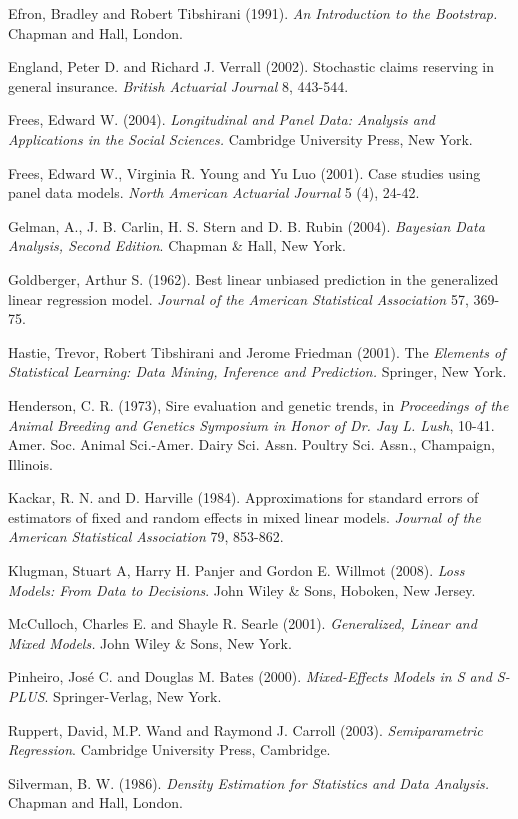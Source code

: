 \begin{multicols}{2}

Efron, Bradley and Robert Tibshirani (1991). \textit{An Introduction
to the Bootstrap.} Chapman and Hall, London.

England, Peter D. and Richard J. Verrall (2002). Stochastic claims
reserving in general insurance. \emph{British Actuarial Journal} 8,
443-544.

Frees, Edward W. (2004). \textit{Longitudinal and Panel Data:
Analysis and Applications in the Social Sciences.} Cambridge
University Press, New York.

Frees, Edward W., Virginia R. Young and Yu Luo (2001). Case studies
using panel data models. \emph{North American Actuarial Journal} 5
(4), 24-42.

Gelman, A., J. B. Carlin, H. S. Stern and D. B. Rubin (2004).
\textit{Bayesian Data Analysis, Second Edition}. Chapman \& Hall,
New York.

Goldberger, Arthur S. (1962).  Best linear unbiased prediction in
the generalized linear regression model. \textit{Journal of the
American Statistical Association} 57, 369-75.

Hastie, Trevor, Robert Tibshirani and Jerome Friedman (2001). The
\emph{Elements of Statistical Learning: Data Mining, Inference and
Prediction.} Springer, New York.

Henderson, C. R. (1973), Sire evaluation and genetic trends, in
\textit{Proceedings of the Animal Breeding and Genetics Symposium in
Honor of Dr. Jay L. Lush}, 10-41. Amer. Soc. Animal Sci.-Amer. Dairy
Sci. Assn. Poultry Sci. Assn., Champaign, Illinois.

Kackar, R. N. and D. Harville (1984). Approximations for standard
errors of estimators of fixed and random effects in mixed linear
models. \textit{Journal of the American Statistical Association} 79,
853-862.

Klugman, Stuart A, Harry H. Panjer and Gordon E. Willmot (2008).
\emph{Loss Models: From Data to Decisions}. John Wiley \& Sons,
Hoboken, New Jersey.

McCulloch, Charles E. and Shayle R. Searle (2001).
\textit{Generalized, Linear and Mixed Models.} John Wiley \& Sons,
New York.

Pinheiro, Jos\'{e} C. and Douglas M. Bates (2000).
\textit{Mixed-Effects Models in S and S-PLUS}. Springer-Verlag, New
York.

Ruppert, David, M.P. Wand and Raymond J. Carroll (2003).
\textit{Semiparametric Regression}. Cambridge University Press,
Cambridge.

Silverman, B. W. (1986). \textit{Density Estimation for Statistics
and Data Analysis.} Chapman and Hall, London.


\end{multicols}


